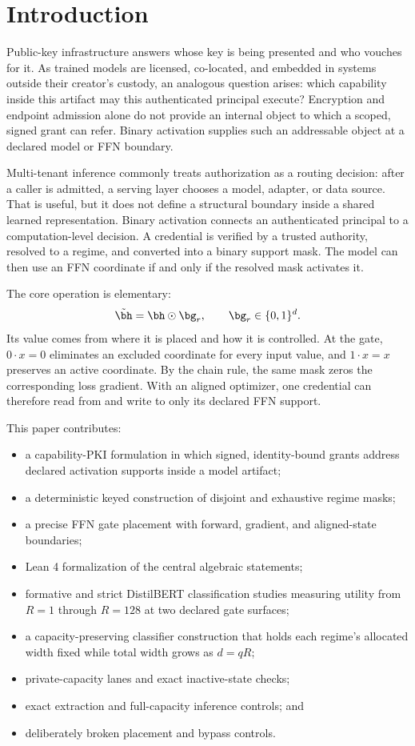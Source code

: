 \documentclass[11pt]{article}
\begin{document}
\section{Introduction}

Public-key infrastructure answers whose key is being presented and who vouches
for it. As trained models are licensed, co-located, and embedded in systems
outside their creator's custody, an analogous question arises: which capability
inside this artifact may this authenticated principal execute? Encryption and
endpoint admission alone do not provide an internal object to which a scoped,
signed grant can refer. Binary activation supplies such an addressable object at
a declared model or FFN boundary.

Multi-tenant inference commonly treats authorization as a routing decision:
after a caller is admitted, a serving layer chooses a model, adapter, or data
source. That is useful, but it does not define a structural boundary inside a
shared learned representation. Binary activation connects an authenticated
principal to a computation-level decision. A credential is verified by a
trusted authority, resolved to a regime, and converted into a binary support
mask. The model can then use an FFN coordinate if and only if the resolved mask
activates it.

The core operation is elementary:
\begin{equation}
  \tilde{\bh}=\bh\odot\bg_r,
  \qquad \bg_r\in\{0,1\}^d.
  \label{eq:gate}
\end{equation}
Its value comes from where it is placed and how it is controlled. At the gate,
$0\cdot x=0$ eliminates an excluded coordinate for every input value, and
$1\cdot x=x$ preserves an active coordinate. By the chain rule, the same mask
zeros the corresponding loss gradient. With an aligned optimizer, one
credential can therefore read from and write to only its declared FFN support.

This paper contributes:
\begin{itemize}
  \item a capability-PKI formulation in which signed, identity-bound grants
  address declared activation supports inside a model artifact;
  \item a deterministic keyed construction of disjoint and exhaustive regime
  masks;
  \item a precise FFN gate placement with forward, gradient, and aligned-state
  boundaries;
  \item Lean 4 formalization of the central algebraic statements;
  \item formative and strict DistilBERT classification studies measuring
  utility from $R=1$ through $R=128$ at two declared gate surfaces;
  \item a capacity-preserving classifier construction that holds each regime's
  allocated width fixed while total width grows as $d=qR$;
  \item private-capacity lanes and exact inactive-state checks;
  \item exact extraction and full-capacity inference controls; and
  \item deliberately broken placement and bypass controls.
\end{itemize}
\end{document}
